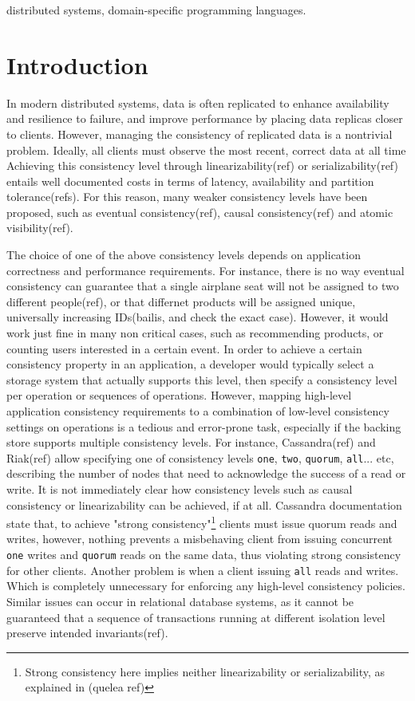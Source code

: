 \documentclass[preprint, numbers]{sigplanconf}
\begin{document}
\keywords
distributed systems, domain-specific programming languages.

\section{Introduction}
In modern distributed systems, data is often replicated 
to enhance availability and resilience to failure, and improve performance by
placing data replicas closer to clients. However, managing the consistency of 
replicated data is a nontrivial problem. Ideally, all clients must observe the most recent, correct data at all time 
Achieving this consistency level through linearizability(ref) or
serializability(ref) entails well
documented costs in terms of latency, availability and partition
tolerance(refs). For this reason, many weaker consistency levels have been proposed,
such as eventual consistency(ref), causal consistency(ref) and atomic
visibility(ref).

The choice of one of the above consistency levels depends on application
correctness and performance requirements. For instance, there is no way eventual consistency
can guarantee that a single airplane seat will not be assigned to two different
people(ref), or that differnet products will be assigned unique, universally
increasing IDs(bailis, and check the exact case). However, it would work just fine
in many non critical cases, such as recommending products, or counting users
interested in a certain event. In order to achieve a certain consistency
property in an application, a developer would typically select a storage system that
actually supports this level, then specify a consistency level per operation or
sequences of operations. However, mapping high-level application consistency requirements to  a combination of
low-level consistency settings on operations is a tedious and error-prone task, especially if
the backing store supports multiple consistency levels. For instance,
Cassandra(ref) and Riak(ref) allow specifying one of consistency levels
\texttt{one}, \texttt{two}, \texttt{quorum}, \texttt{all}... etc, describing the number of nodes that need to
acknowledge the success of a read or write. It
is not immediately clear how consistency levels such as causal consistency or
linearizability can be achieved, if at all.  Cassandra documentation state that,
to achieve "strong consistency"\footnote{ Strong consistency here implies
neither linearizability or serializability, as explained in (quelea ref)} clients must issue quorum reads and writes,
however, nothing prevents a misbehaving client from issuing concurrent \texttt{one} writes and
\texttt{quorum} reads on the same data, thus violating strong consistency for other clients. Another
problem is when a client issuing \texttt{all} reads and writes. Which is completely
unnecessary for enforcing any high-level consistency policies. Similar issues
can occur in relational database systems, as it cannot be guaranteed that a
sequence of transactions running at different isolation level preserve intended invariants(ref). 
\end{document}
